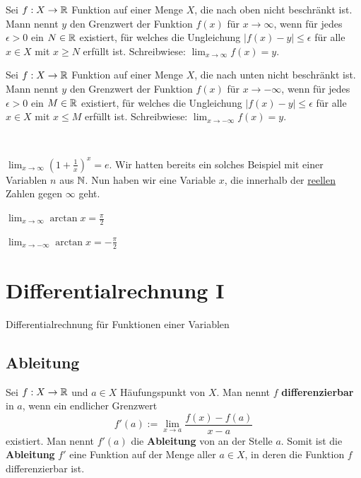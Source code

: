 \begin{defn}
	Sei $f : X \to \mathbb{R}$ Funktion auf einer Menge $X$, die nach oben nicht beschränkt ist. Mann nennt 
	$y$ den Grenzwert der Funktion $f(x)$ für $x \to \infty$, wenn für jedes $\epsilon>0$ ein $N \in \mathbb{R}$ existiert, für welches die Ungleichung $|f(x) - y| \le \epsilon$ für alle $x \in X$ mit $x \ge N$ erfüllt ist. Schreibwiese: $\lim_{x \to \infty} f(x) = y$. 
\end{defn} 

\begin{defn}
	Sei $f : X \to \mathbb{R}$ Funktion auf einer Menge $X$, die nach unten nicht beschränkt ist. Mann nennt 
	$y$ den Grenzwert der Funktion $f(x)$ für $x \to -\infty$, wenn für jedes $\epsilon>0$ ein $M \in \mathbb{R}$ existiert, für welches die Ungleichung $|f(x) - y| \le \epsilon$ für alle $x \in X$ mit $x \le M$ erfüllt ist. Schreibwiese: $\lim_{x \to -\infty} f(x) = y$. 
\end{defn} 

\begin{bsp} { \ } 
	\begin{enuma}
		\item $\lim_{x \to \infty} \left( 1 + \frac{1}{x} \right)^x = e$. Wir hatten bereits ein solches Beispiel mit einer Variablen $n$ aus $\mathbb{N}$. Nun haben wir eine Variable $x$, die innerhalb der \underline{reellen} Zahlen gegen $\infty$ geht. 
		\item $\lim_{x \to \infty} \arctan x  = \frac{\pi}{2}$ 
		\item $\lim_{x \to -\infty} \arctan x  = - \frac{\pi}{2}$ 
	\end{enuma} 
\end{bsp} 


\chapter{Differentialrechnung I}

Differentialrechnung für Funktionen einer Variablen

\section{Ableitung} 

\begin{defn}[Ableitung] 
	Sei $f : X \to \mathbb{R}$ und $a \in X$ Häufungspunkt von $X$. Man nennt $f$ \textbf{differenzierbar} in $a$, wenn ein endlicher Grenzwert
	\[
		f'(a) := \lim_{x \to a} \frac{f(x)-f(a)}{x-a}
	\]
	existiert. Man nennt $f'(a)$ die \textbf{Ableitung} von an der Stelle $a$. Somit ist die \textbf{Ableitung} $f'$ eine Funktion auf der Menge aller $a \in X$, in deren die Funktion $f$ differenzierbar ist. 
\end{defn} 

